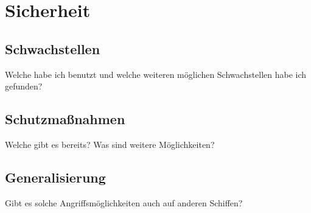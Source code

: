\chapter{Sicherheit}

\section{Schwachstellen}
Welche habe ich benutzt und welche weiteren möglichen Schwachstellen habe ich gefunden?

\section{Schutzmaßnahmen}
Welche gibt es bereits?
Was sind weitere Möglichkeiten?

\section{Generalisierung}
Gibt es solche Angriffsmöglichkeiten auch auf anderen Schiffen?